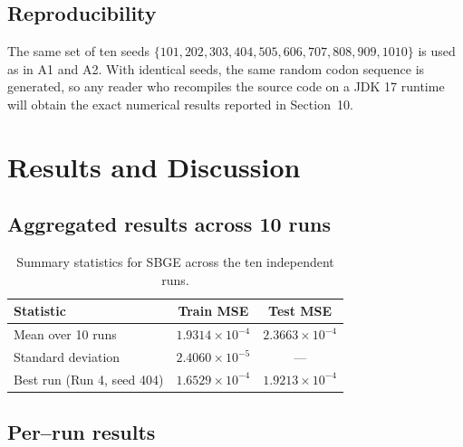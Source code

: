 \documentclass[12pt,a4paper]{article}
\begin{document}
\subsection{Reproducibility}
The same set of ten seeds $\{101, 202, 303, 404, 505, 606, 707, 808,
909, 1010\}$ is used as in A1 and A2. With identical seeds, the same
random codon sequence is generated, so any reader who recompiles the
source code on a JDK 17 runtime will obtain the exact numerical results
reported in Section~10.

\section{Results and Discussion}

\subsection{Aggregated results across 10 runs}

\begin{table}[H]
\centering
\begin{tabular}{l c c}
\toprule
\textbf{Statistic} & \textbf{Train MSE} & \textbf{Test MSE} \\
\midrule
Mean over 10 runs                & $1.9314 \times 10^{-4}$  & $2.3663 \times 10^{-4}$ \\
Standard deviation               & $2.4060 \times 10^{-5}$  & --- \\
Best run (Run 4, seed 404)       & $1.6529 \times 10^{-4}$  & $1.9213 \times 10^{-4}$ \\
\bottomrule
\end{tabular}
\caption{Summary statistics for SBGE across the ten independent runs.}
\end{table}

\subsection{Per--run results}
\end{document}
